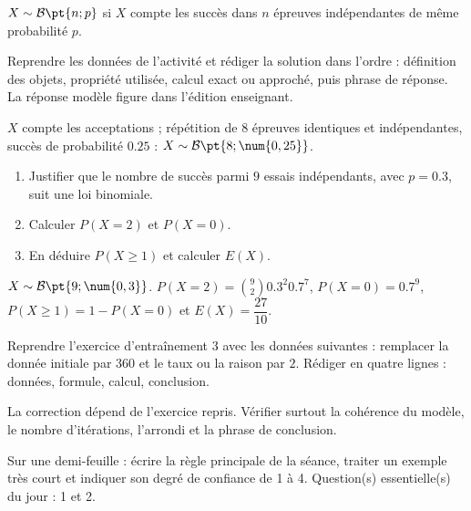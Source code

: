 \begin{summary}$X\sim\mathcal B\pt{n;p}$ si $X$ compte les succès dans $n$ épreuves indépendantes de même probabilité $p$.\end{summary}

\begin{example}
Reprendre les données de l'activité et rédiger la solution dans l'ordre : définition des objets, propriété utilisée, calcul exact ou approché, puis phrase de réponse. La réponse modèle figure dans l'édition enseignant.
\end{example}
\begin{solution}$X$ compte les acceptations ; répétition de 8 épreuves identiques et indépendantes, succès de probabilité $\num{0,25}$ : $X\sim\mathcal B\pt{8;\num{0,25}}$.\end{solution}

\begin{exercise}[essentiel]
\begin{enumerate}\item Justifier que le nombre de succès parmi $9$ essais indépendants, avec $p=\num{0,3}$, suit une loi binomiale.\item Calculer $P(X=2)$ et $P(X=0)$.\item En déduire $P(X\geq1)$ et calculer $E(X)$.\end{enumerate}
\end{exercise}
\begin{solution}$X\sim\mathcal B\pt{9;\num{0,3}}$. $P(X=2)=\binom{9}2 \num{0,3}^2 \num{0,7}^{7}$, $P(X=0)=\num{0,7}^{9}$, $P(X\geq1)=1-P(X=0)$ et $E(X)=\dfrac{27}{10}$.\end{solution}


\begin{homework}Reprendre l'exercice d'entraînement 3 avec les données suivantes : remplacer la donnée initiale par $360$ et le taux ou la raison par $2$. Rédiger en quatre lignes : données, formule, calcul, conclusion.\end{homework}
\begin{solution}La correction dépend de l'exercice repris. Vérifier surtout la cohérence du modèle, le nombre d'itérations, l'arrondi et la phrase de conclusion.\end{solution}

\begin{exitticket}[3 minutes]Sur une demi-feuille : écrire la règle principale de la séance, traiter un exemple très court et indiquer son degré de confiance de 1 à 4. Question(s) essentielle(s) du jour : 1 et 2.\end{exitticket}


